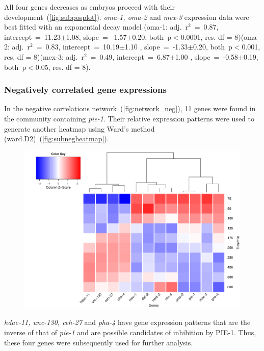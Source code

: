 \documentclass[11pt]{article}
\begin{document}
All four genes decreases as embryos proceed with their development~(\autoref{fig:subposplot}).  \textit{oma-1, oma-2} and \textit{mex-3} expression data were best fitted with an exponential decay model (oma-1: adj.~r$^2$~=~0.87, intercept~=~11.23$\pm$1.08, slope~=~-1.57$\pm$0.20, both~p$<$0.0001, res. df = 8)(oma-2: adj.~r$^2$~=~0.83, intercept~=~10.19$\pm$1.10 , slope~=~-1.33$\pm$0.20, both~p$<$0.001, res. df = 8)(mex-3: adj.~r$^2$~=~0.49, intercept~=~6.87$\pm$1.00 , slope~=~-0.58$\pm$0.19, both~p$<$0.05, res. df = 8).


\subsubsection{Negatively correlated gene expressions}
In the negative correlations network~(\autoref{fig:network_neg}), 11 genes were found in the community containing \textit{pie-1}. Their relative expression patterns were used to generate another heatmap using Ward's method (ward.D2)~(\autoref{fig:subnegheatmap}).
\smallskip
\begin{figure}[H]
  \centering
    \includegraphics[width=\textwidth]{subnegheatmap.pdf}
  \label{fig:subnegheatmap}
\end{figure}

\textit{hdac-11, unc-130, ceh-27} and \textit{pha-4} have gene expression patterns that are the inverse of that of \textit{pie-1} and are possible candidates of inhibition by PIE-1. Thus, these four genes were subsequently used for further analysis.
\end{document}
